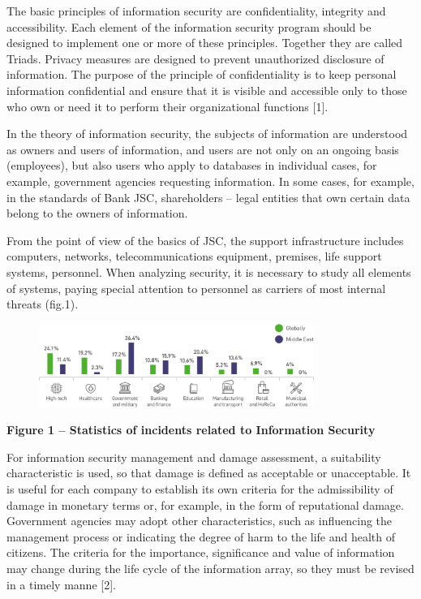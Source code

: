 The basic principles of information security are confidentiality,
integrity and accessibility. Each element of the information security
program should be designed to implement one or more of these principles.
Together they are called Triads. Privacy measures are designed to
prevent unauthorized disclosure of information. The purpose of the
principle of confidentiality is to keep personal information
confidential and ensure that it is visible and accessible only to those
who own or need it to perform their organizational functions {[}1{]}.

In the theory of information security, the subjects of information are
understood as owners and users of information, and users are not only on
an ongoing basis (employees), but also users who apply to databases in
individual cases, for example, government agencies requesting
information. In some cases, for example, in the standards of Bank JSC,
shareholders -- legal entities that own certain data belong to the
owners of information.

From the point of view of the basics of JSC, the support infrastructure
includes computers, networks, telecommunications equipment, premises,
life support systems, personnel. When analyzing security, it is
necessary to study all elements of systems, paying special attention to
personnel as carriers of most internal threats (fig.1).

\begin{figure}[H]
	\centering
	\includegraphics[width=0.8\textwidth]{assets/63}
	\caption*{}
\end{figure}\textbf{Figure
1 -- Statistics of incidents related to Information Security}

For information security management and damage assessment, a suitability
characteristic is used, so that damage is defined as acceptable or
unacceptable. It is useful for each company to establish its own
criteria for the admissibility of damage in monetary terms or, for
example, in the form of reputational damage. Government agencies may
adopt other characteristics, such as influencing the management process
or indicating the degree of harm to the life and health of citizens. The
criteria for the importance, significance and value of information may
change during the life cycle of the information array, so they must be
revised in a timely manne {[}2{]}.

